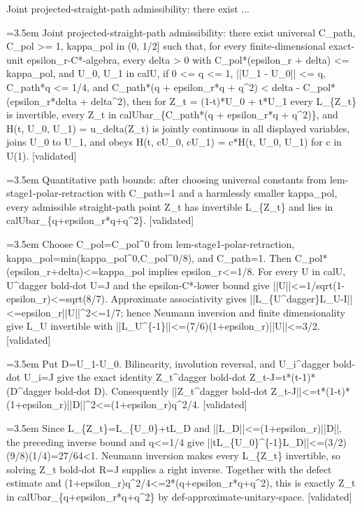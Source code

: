 \documentclass{article}
\newcommand{\step}[1]{\par\noindent\hangindent=3.5em\hangafter=1%
  \makebox[3.5em][l]{\textbf{#1.}}}
\newcommand{\steptag}[1]{\hfill{\small\textsf{[#1]}}}
\begin{document}
\begin{proofbox}{Joint projected-straight-path admissibility: there exist ...}
\step{1} Joint projected-straight-path admissibility: there exist universal C\_path, C\_pol >= 1, kappa\_pol in (0, 1/2] such that, for every finite-dimensional exact-unit epsilon\_r-C*-algebra, every delta > 0 with C\_pol*(epsilon\_r + delta) <= kappa\_pol, and U\_0, U\_1 in calU, if 0 <= q <= 1, ||U\_1 - U\_0|| <= q, C\_path*q <= 1/4, and C\_path*(q + epsilon\_r*q + q\textasciicircum{}2) < delta - C\_pol*(epsilon\_r*delta + delta\textasciicircum{}2), then for Z\_t = (1-t)*U\_0 + t*U\_1 every L\_\{Z\_t\} is invertible, every Z\_t in calUbar\_\{C\_path*(q + epsilon\_r*q + q\textasciicircum{}2)\}, and H(t, U\_0, U\_1) = u\_delta(Z\_t) is jointly continuous in all displayed variables, joins U\_0 to U\_1, and obeys H(t, cU\_0, cU\_1) = c*H(t, U\_0, U\_1) for c in U(1). \steptag{validated} \\[6pt]
\step{1.1} Quantitative path bounds: after choosing universal constants from lem-stage1-polar-retraction with C\_path=1 and a harmlessly smaller kappa\_pol, every admissible straight-path point Z\_t has invertible L\_\{Z\_t\} and lies in calUbar\_\{q+epsilon\_r*q+q\textasciicircum{}2\}. \steptag{validated} \\[6pt]
\step{1.1.1} Choose C\_pol=C\_pol\textasciicircum{}0 from lem-stage1-polar-retraction, kappa\_pol=min(kappa\_pol\textasciicircum{}0,C\_pol\textasciicircum{}0/8), and C\_path=1. Then C\_pol*(epsilon\_r+delta)<=kappa\_pol implies epsilon\_r<=1/8. For every U in calU, U\textasciicircum{}dagger bold-dot U=J and the epsilon-C*-lower bound give ||U||<=1/sqrt(1-epsilon\_r)<=sqrt(8/7). Approximate associativity gives ||L\_\{U\textasciicircum{}dagger\}L\_U-I||<=epsilon\_r||U||\textasciicircum{}2<=1/7; hence Neumann inversion and finite dimensionality give L\_U invertible with ||L\_U\textasciicircum{}\{-1\}||<=(7/6)(1+epsilon\_r)||U||<=3/2. \steptag{validated} \\[4pt]
\step{1.1.2} Put D=U\_1-U\_0. Bilinearity, involution reversal, and U\_i\textasciicircum{}dagger bold-dot U\_i=J give the exact identity Z\_t\textasciicircum{}dagger bold-dot Z\_t-J=t*(t-1)*(D\textasciicircum{}dagger bold-dot D). Consequently ||Z\_t\textasciicircum{}dagger bold-dot Z\_t-J||<=t*(1-t)*(1+epsilon\_r)||D||\textasciicircum{}2<=(1+epsilon\_r)q\textasciicircum{}2/4. \steptag{validated} \\[4pt]
\step{1.1.3} Since L\_\{Z\_t\}=L\_\{U\_0\}+tL\_D and ||L\_D||<=(1+epsilon\_r)||D||, the preceding inverse bound and q<=1/4 give ||tL\_\{U\_0\}\textasciicircum{}\{-1\}L\_D||<=(3/2)(9/8)(1/4)=27/64<1. Neumann inversion makes every L\_\{Z\_t\} invertible, so solving Z\_t bold-dot R=J supplies a right inverse. Together with the defect estimate and (1+epsilon\_r)q\textasciicircum{}2/4<=2*(q+epsilon\_r*q+q\textasciicircum{}2), this is exactly Z\_t in calUbar\_\{q+epsilon\_r*q+q\textasciicircum{}2\} by def-approximate-unitary-space. \steptag{validated} \\[4pt]

\end{proofbox}
\end{document}
